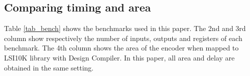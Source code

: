 \documentclass[runningheads,a4paper,orivec]{llncs}
\begin{document}

\subsection{Comparing timing and area}
Table \ref{tab_bench} shows the benchmarks used in this paper.
The 2nd and 3rd column show respectively the number of inputs, outputs and registers of each benchmark.
The 4th column shows the area of the encoder when mapped to LSI10K library with Design Compiler.
In this paper, 
all area and delay are obtained in the same setting.
\end{document}
